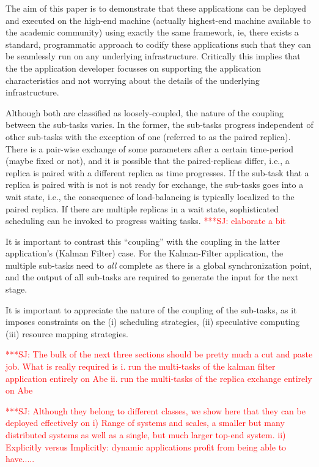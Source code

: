 \documentclass[conference,final]{IEEEtran}
\newcommand{\jhanote}[1]{ {\textcolor{red} { ***SJ: #1 }}}
\newcommand{\jhanote}[1]{}
\begin{document}
The aim of this paper is to demonstrate that these applications can be
deployed and executed on the high-end machine (actually highest-end
machine available to the academic community) using exactly the same
framework, ie, there exists a standard, programmatic approach to
codify these applications such that they can be seamlessly run on any
underlying infrastructure. Critically this implies that the the
application developer focusses on supporting the application
characteristics and not worrying about the details of the underlying
infrastructure.

Although both are classified as loosely-coupled, the nature of the
coupling between the sub-tasks varies. In the former, the sub-tasks
progress independent of other sub-tasks with the exception of one
(referred to as the paired replica). There is a pair-wise exchange of
some parameters after a certain time-period (maybe fixed or not), and
it is possible that the paired-replicas differ, i.e., a replica is
paired with a different replica as time progresses. If the sub-task
that a replica is paired with is not is not ready for exchange, the
sub-tasks goes into a wait state, i.e., the consequence of
load-balancing is typically localized to the paired replica. If there
are multiple replicas in a wait state, sophisticated scheduling can be
invoked to progress waiting tasks. \jhanote{elaborate a bit}

It is important to contrast this ``coupling'' with the coupling in the
latter application's (Kalman Filter) case. For the Kalman-Filter
application, the multiple sub-tasks need to {\it all} complete
as there is a global synchronization point, and the output
of all sub-tasks are required to generate the input for the next
stage.

It is important to appreciate the nature of the coupling of
the sub-tasks, as it imposes constraints on the 
(i) scheduling strategies, (ii) speculative computing (iii) resource
mapping strategies.

\jhanote{The bulk of the next three sections should be pretty much a
  cut and paste job. What is really required is i. run the multi-tasks
  of the kalman filter application entirely on Abe ii. run the
  multi-tasks of the replica exchange entirely on Abe}

\jhanote{Although they belong to different classes, we show here that
  they can be deployed effectively on i) Range of systems and scales,
  a smaller but many distributed systems as well as a single, but much
  larger top-end system. ii) Explicitly versus Implicitly: dynamic
  applications profit from being able to have.....}
\end{document}
